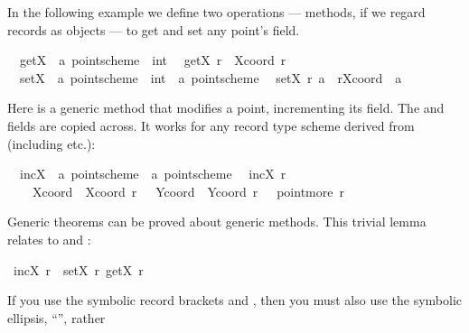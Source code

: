 \begin{isabellebody}
\begin{isamarkuptext}
  In the following example we define two operations --- methods, if we
  regard records as objects --- to get and set any point's  field.%
\end{isamarkuptext}%
\isamarkuptrue%
\isanewline
\ \ getX\ {\isacharcolon}{\isacharcolon}\ {\isachardoublequote}{\isacharprime}a\ point{\isacharunderscore}scheme\ {\isasymRightarrow}\ int{\isachardoublequote}\isanewline
\ \ {\isachardoublequote}getX\ r\ {\isasymequiv}\ Xcoord\ r{\isachardoublequote}\isanewline
\ \ setX\ {\isacharcolon}{\isacharcolon}\ {\isachardoublequote}{\isacharprime}a\ point{\isacharunderscore}scheme\ {\isasymRightarrow}\ int\ {\isasymRightarrow}\ {\isacharprime}a\ point{\isacharunderscore}scheme{\isachardoublequote}\isanewline
\ \ {\isachardoublequote}setX\ r\ a\ {\isasymequiv}\ r{\isasymlparr}Xcoord\ {\isacharcolon}{\isacharequal}\ a{\isasymrparr}{\isachardoublequote}\isamarkupfalse%
%
\begin{isamarkuptext}%
Here is a generic method that modifies a point, incrementing its
   field.  The  and  fields
  are copied across.  It works for any record type scheme derived from
   (including  etc.):%
\end{isamarkuptext}%
\isamarkuptrue%
\isanewline
\ \ incX\ {\isacharcolon}{\isacharcolon}\ {\isachardoublequote}{\isacharprime}a\ point{\isacharunderscore}scheme\ {\isasymRightarrow}\ {\isacharprime}a\ point{\isacharunderscore}scheme{\isachardoublequote}\isanewline
\ \ {\isachardoublequote}incX\ r\ {\isasymequiv}\isanewline
\ \ \ \ {\isasymlparr}Xcoord\ {\isacharequal}\ Xcoord\ r\ {\isacharplus}\ {}{\isacharcomma}\ Ycoord\ {\isacharequal}\ Ycoord\ r{\isacharcomma}\ {\isasymdots}\ {\isacharequal}\ point{\isachardot}more\ r{\isasymrparr}{\isachardoublequote}\isamarkupfalse%
%
\begin{isamarkuptext}%
Generic theorems can be proved about generic methods.  This trivial
  lemma relates  to  and :%
\end{isamarkuptext}%
\isamarkuptrue%
\ {\isachardoublequote}incX\ r\ {\isacharequal}\ setX\ r\ {\isacharparenleft}getX\ r\ {\isacharplus}\ {}{\isacharparenright}{\isachardoublequote}\isanewline
\ \ \isamarkupfalse%
\isamarkupfalse%
%
\begin{isamarkuptext}%
\begin{warn}
  If you use the symbolic record brackets \isa{{\isasymlparr}} and \isa{{\isasymrparr}},
  then you must also use the symbolic ellipsis, ``\isa{{\isasymdots}}'', rather

\end{warn}
\end{isamarkuptext}
\end{isabellebody}

